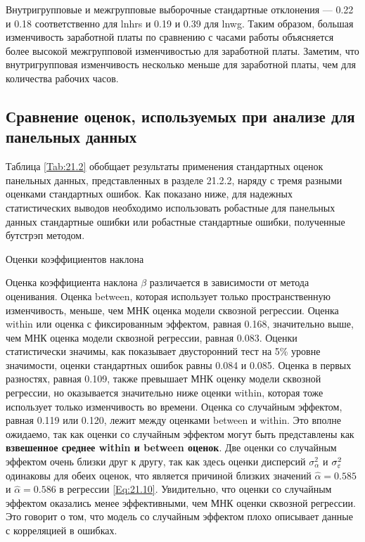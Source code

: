 Внутригрупповые и межгрупповые выборочные стандартные отклонения --- 0.22 и 0.18 соответственно для lnhrs и 0.19 и 0.39 для lnwg. Таким образом, большая изменчивость заработной платы по сравнению с часами работы объясняется более высокой межгрупповой изменчивостью для заработной платы. Заметим, что внутригрупповая изменчивость несколько меньше для заработной платы, чем для количества рабочих часов.

\subsection{Сравнение оценок, используемых при анализе для панельных данных}
Таблица \ref{Tab:21.2} обобщает результаты применения стандартных оценок панельных данных, представленных в разделе 21.2.2, наряду с тремя разными оценками стандартных ошибок. Как показано ниже, для надежных статистических выводов необходимо использовать робастные для панельных данных стандартные ошибки  или робастные стандартные ошибки, полученные бутстрэп методом.

{\centering
Оценки коэффициентов наклона\\}

Оценка коэффициента наклона $\beta$ различается в зависимости от метода оценивания.  Оценка between, которая использует только пространственную изменчивость, меньше, чем МНК оценка модели сквозной регрессии. Оценка within или оценка с фиксированным эффектом, равная 0.168, значительно выше, чем МНК оценка модели сквозной регрессии, равная 0.083. Оценки статистически значимы, как показывает двусторонний тест на 5\% уровне значимости, оценки стандартных ошибок равны 0.084 и 0.085. %
Оценка в первых разностях, равная 0.109, также превышает МНК оценку модели сквозной регрессии, но оказывается значительно ниже оценки within, которая тоже использует только изменчивость во времени. Оценка со случайным эффектом, равная 0.119 или 0.120, лежит между оценками between и within. Это вполне ожидаемо, так как оценки со случайным эффектом могут быть представлены как \textbf{взвешенное среднее within и between оценок}. Две оценки со случайным эффектом очень близки друг к другу, так как здесь оценки дисперсий $\sigma^2_{\alpha}$ и $\sigma^2_{\varepsilon}$ одинаковы для обеих оценок, что является причиной близких значений $\hat{\alpha}=0.585$ и $\hat{\alpha}=0.586$ в регрессии \ref{Eq:21.10}. Увидительно, что оценки со случайным эффектом оказались менее эффективными, чем МНК оценки сквозной регрессии. Это говорит о том, что модель со случайным эффектом плохо описывает данные с корреляцией в ошибках. 

